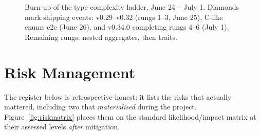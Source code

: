 \begin{figure}[h]
\centering
{}
\caption{Burn-up of the type-complexity ladder, June 24 -- July 1. Diamonds mark shipping events: v0.29--v0.32 (rungs 1--3, June 25), C-like enums e2e (June 26), and v0.34.0 completing rungs 4--6 (July 1). Remaining rungs: nested aggregates, then traits.}
\label{fig:ladder}
\end{figure}

\section{Risk Management}
\label{sec:risk}

The register below is retrospective-honest: it lists the risks that actually mattered, including two that \emph{materialised} during the project. Figure~\ref{fig:riskmatrix} places them on the standard likelihood/impact matrix at their assessed levels \emph{after} mitigation.

